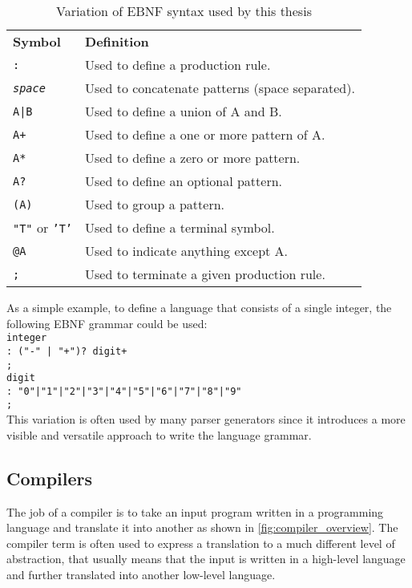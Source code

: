 \begin{table}[H]
    \centering
    \begin{tabular}{ l p{10cm} }
        \textbf{Symbol} & \textbf{Definition} \\
        \texttt{:} & Used to define a production rule. \\
        \texttt{\textit{space}} & Used to concatenate patterns (space separated). \\
        \texttt{A|B} & Used to define a union of A and B. \\
        \texttt{A+} & Used to define a one or more pattern of A. \\
        \texttt{A*} & Used to define a zero or more pattern. \\
        \texttt{A?} & Used to define an optional pattern. \\
        \texttt{(A)} & Used to group a pattern. \\
        \texttt{"T"} or \texttt{'T'} & Used to define a terminal symbol. \\
        \texttt{@A} & Used to indicate anything except A. \\
        \texttt{;} & Used to terminate a given production rule. \\
    \end{tabular}
    \caption{Variation of EBNF syntax used by this thesis}
    \label{fig:ebnf_syntax}
\end{table}

As a simple example, to define a language that consists of a single integer, the following EBNF grammar could be used:\\

\texttt{integer\\\tab: ("-" | "+")? digit+\\\tab;}\\
\texttt{digit\\\tab: "0"|"1"|"2"|"3"|"4"|"5"|"6"|"7"|"8"|"9"\\\tab;}\\

This variation is often used by many parser generators since it introduces a more visible and versatile approach to
write the language grammar.

\subsection{Compilers}

The job of a compiler is to take an input program written in a programming language and translate it into another as shown in \autoref{fig:compiler_overview}.
The compiler term is often used to express a translation to a much different level of abstraction, that usually means
that the input is written in a high-level language and further translated into another low-level language.

